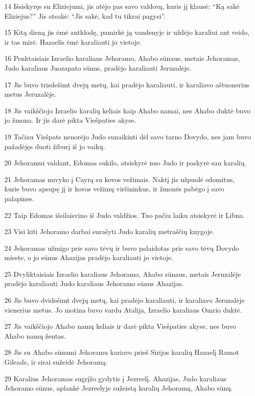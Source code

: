 \par 14 Išsiskyręs su Eliziejumi, jis atėjo pas savo valdovą, kuris jį klausė: “Ką sakė Eliziejus?” Jis atsakė: “Jis sakė, kad tu tikrai pagysi”. 
\par 15 Kitą dieną jis ėmė antklodę, pamirkė ją vandenyje ir uždėjo karaliui ant veido, ir tas mirė. Hazaelis ėmė karaliauti jo vietoje. 
\par 16 Penktaisiais Izraelio karaliaus Jehoramo, Ahabo sūnaus, metais Jehoramas, Judo karaliaus Juozapato sūnus, pradėjo karaliauti Jeruzalėje. 
\par 17 Jis buvo trisdešimt dvejų metų, kai pradėjo karaliauti, ir karaliavo aštuonerius metus Jeruzalėje. 
\par 18 Jis vaikščiojo Izraelio karalių keliais kaip Ahabo namai, nes Ahabo duktė buvo jo žmona. Ir jis darė pikta Viešpaties akyse. 
\par 19 Tačiau Viešpats nenorėjo Judo sunaikinti dėl savo tarno Dovydo, nes jam buvo pažadėjęs duoti žiburį iš jo vaikų. 
\par 20 Jehoramui valdant, Edomas sukilo, atsiskyrė nuo Judo ir paskyrė sau karalių. 
\par 21 Jehoramas nuvyko į Cayrą su kovos vežimais. Naktį jis užpuolė edomitus, kurie buvo apsupę jį ir kovos vežimų viršininkus, ir žmonės pabėgo į savo palapines. 
\par 22 Taip Edomas išsilaisvino iš Judo valdžios. Tuo pačiu laiku atsiskyrė ir Libna. 
\par 23 Visi kiti Jehoramo darbai surašyti Judo karalių metraščių knygoje. 
\par 24 Jehoramas užmigo prie savo tėvų ir buvo palaidotas prie savo tėvų Dovydo mieste, o jo sūnus Ahazijas pradėjo karaliauti jo vietoje. 
\par 25 Dvyliktaisiais Izraelio karaliaus Jehoramo, Ahabo sūnaus, metais Jeruzalėje pradėjo karaliauti Judo karaliaus Jehoramo sūnus Ahazijas. 
\par 26 Jis buvo dvidešimt dvejų metų, kai pradėjo karaliauti, ir karaliavo Jeruzalėje vienerius metus. Jo motina buvo vardu Atalija, Izraelio karaliaus Omrio duktė. 
\par 27 Jis vaikščiojo Ahabo namų keliais ir darė pikta Viešpaties akyse, nes buvo Ahabo namų žentas. 
\par 28 Jis su Ahabo sūnumi Jehoramu kariavo prieš Sirijos karalių Hazaelį Ramot Gileade, ir sirai sužeidė Jehoramą. 
\par 29 Karalius Jehoramas sugrįžo gydytis į Jezreelį. Ahazijas, Judo karaliaus Jehoramo sūnus, aplankė Jezreelyje sužeistą karalių Jehoramą, Ahabo sūnų.



